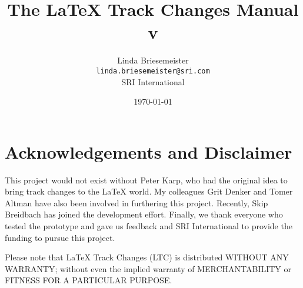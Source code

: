 \documentclass[twoside]{report}
\title{The \LaTeX{} Track Changes Manual \\ {\large v\version}}
\author{%
Linda Briesemeister\\
\texttt{linda.briesemeister@sri.com}\\
SRI International
}
\date{\today}
\begin{document}
\maketitle
{\pagestyle{empty}\cleardoublepage} %

\tableofcontents

\chapter*{Acknowledgements and Disclaimer}

This project would not exist without Peter Karp, who had the original idea to bring track changes to the LaTeX world.  My colleagues Grit Denker and Tomer Altman have also been involved in furthering this project.  Recently, Skip Breidbach has joined the development effort.  Finally, we thank everyone who tested the prototype and gave us feedback and SRI International to provide the funding to pursue this project.

Please note that LaTeX Track Changes (LTC) is distributed WITHOUT ANY WARRANTY; without even the implied warranty of MERCHANTABILITY or FITNESS FOR A PARTICULAR PURPOSE.










%


\end{document}
